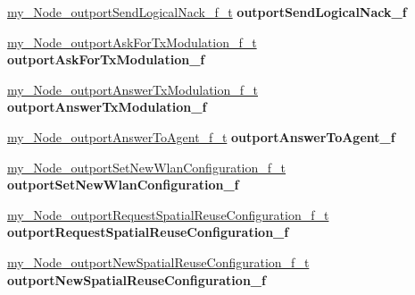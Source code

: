 \begin{DoxyCompactItemize}
\item 
\mbox{\label{classcompcxx__Node__23_ad7dfbd98240ce5aa35dd61518a1470de}} 
\hyperlink{classcompcxx__Node__23_1_1my__Node__outportSendLogicalNack__f__t}{my\+\_\+\+Node\+\_\+outport\+Send\+Logical\+Nack\+\_\+f\+\_\+t} {\bfseries outport\+Send\+Logical\+Nack\+\_\+f}
\item 
\mbox{\label{classcompcxx__Node__23_a0caf34ac8d746e5e8cd0959c7cec7eb5}} 
\hyperlink{classcompcxx__Node__23_1_1my__Node__outportAskForTxModulation__f__t}{my\+\_\+\+Node\+\_\+outport\+Ask\+For\+Tx\+Modulation\+\_\+f\+\_\+t} {\bfseries outport\+Ask\+For\+Tx\+Modulation\+\_\+f}
\item 
\mbox{\label{classcompcxx__Node__23_ad87a3f8a5cb126dfbe7427db8947ba6b}} 
\hyperlink{classcompcxx__Node__23_1_1my__Node__outportAnswerTxModulation__f__t}{my\+\_\+\+Node\+\_\+outport\+Answer\+Tx\+Modulation\+\_\+f\+\_\+t} {\bfseries outport\+Answer\+Tx\+Modulation\+\_\+f}
\item 
\mbox{\label{classcompcxx__Node__23_a3ec956cf2bbc782f99ff9c9319e2aa5b}} 
\hyperlink{classcompcxx__Node__23_1_1my__Node__outportAnswerToAgent__f__t}{my\+\_\+\+Node\+\_\+outport\+Answer\+To\+Agent\+\_\+f\+\_\+t} {\bfseries outport\+Answer\+To\+Agent\+\_\+f}
\item 
\mbox{\label{classcompcxx__Node__23_a5a23b6d1642852b756e956bd801aa8c9}} 
\hyperlink{classcompcxx__Node__23_1_1my__Node__outportSetNewWlanConfiguration__f__t}{my\+\_\+\+Node\+\_\+outport\+Set\+New\+Wlan\+Configuration\+\_\+f\+\_\+t} {\bfseries outport\+Set\+New\+Wlan\+Configuration\+\_\+f}
\item 
\mbox{\label{classcompcxx__Node__23_af23a7009c1206d0df051e155362f19e8}} 
\hyperlink{classcompcxx__Node__23_1_1my__Node__outportRequestSpatialReuseConfiguration__f__t}{my\+\_\+\+Node\+\_\+outport\+Request\+Spatial\+Reuse\+Configuration\+\_\+f\+\_\+t} {\bfseries outport\+Request\+Spatial\+Reuse\+Configuration\+\_\+f}
\item 
\mbox{\label{classcompcxx__Node__23_af18ab21770e50581e589e96a2954fc71}} 
\hyperlink{classcompcxx__Node__23_1_1my__Node__outportNewSpatialReuseConfiguration__f__t}{my\+\_\+\+Node\+\_\+outport\+New\+Spatial\+Reuse\+Configuration\+\_\+f\+\_\+t} {\bfseries outport\+New\+Spatial\+Reuse\+Configuration\+\_\+f}

\end{DoxyCompactItemize}
